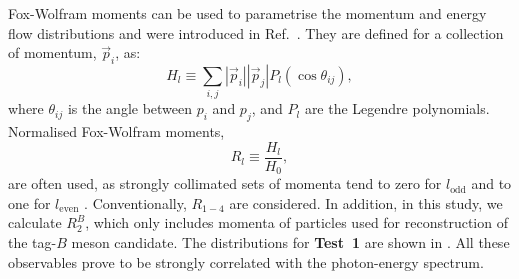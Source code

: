 Fox-Wolfram moments can be used to parametrise the momentum and energy flow distributions and were introduced in Ref.~\cite{Fox:1978vu}.
They are defined for a collection of momentum, $\vec{p}_i$, as:
\begin{equation}
    H_l \equiv \sum_{i,j} |\vec{p}_i||\vec{p}_j|P_l(\cos\theta_{ij}),
\end{equation}
where $\theta_{ij}$ is the angle between $p_i$ and $p_j$, and $P_l$ are the Legendre polynomials.
Normalised Fox-Wolfram moments,
\begin{equation}
R_l\equiv \frac{H_l}{H_0},
\end{equation}
are often used, as strongly collimated sets of momenta tend to zero for $l_{\mathrm{odd}}$ and to one for $l_{\mathrm{even}}$ \cite{BaBar:2014omp}.
Conventionally, $R_{1-4}$ are considered.
In addition, in this study, we calculate $R_2^B$, which only includes momenta of particles used for reconstruction of the tag-$B$ meson candidate.
The distributions for \textbf{Test~1} are shown in .
All these observables prove to be strongly correlated with the photon-energy spectrum.

